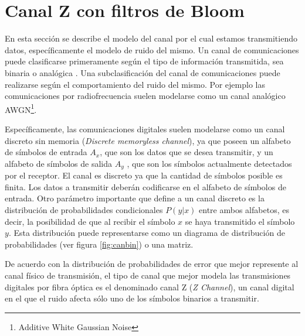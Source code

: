 % 

\section{Canal Z con filtros de Bloom}

En esta sección se describe el modelo del canal por el cual estamos transmitiendo datos, específicamente el modelo de ruido del mismo. 
Un canal de comunicaciones puede clasificarse primeramente según el tipo de información transmitida, sea binaria o analógica \cite{MacKay:2002}.
Una subclasificación del canal de comunicaciones puede realizarse según el comportamiento del ruido del mismo.
Por ejemplo las comunicaciones por radiofrecuencia suelen modelarse como un canal analógico AWGN\footnote{Additive White Gaussian Noise}. 

Específicamente, las comunicaciones digitales suelen modelarse como un canal discreto sin memoria (\textit{Discrete memoryless channel}), ya que poseen un alfabeto de símbolos de entrada $A_{x}$, que son los datos que se desea transmitir, y un alfabeto de símbolos de salida $A_{y}$ , que son los símbolos actualmente detectados por el receptor. El canal es discreto ya que la cantidad de símbolos posible es finita. Los datos a transmitir deberán codificarse en el alfabeto de símbolos de entrada.
Otro parámetro importante que define a un canal discreto es la distribución de probabilidades condicionales $P(y|x)$ entre ambos alfabetos, es decir, la posibilidad de que al recibir el símbolo $x$ se haya transmitido el símbolo $y$. Esta distribución puede representarse como un diagrama de distribución de probabilidades (ver figura \ref{fig:canbin}) o una matriz.

De acuerdo con la distribución de probabilidades de error que mejor represente al canal físico de transmisión, el tipo de canal que mejor modela las transmisiones digitales por fibra óptica es el denominado canal Z (\textit{Z Channel}), un canal digital en el que el ruido afecta sólo uno de los símbolos binarios a transmitir.

